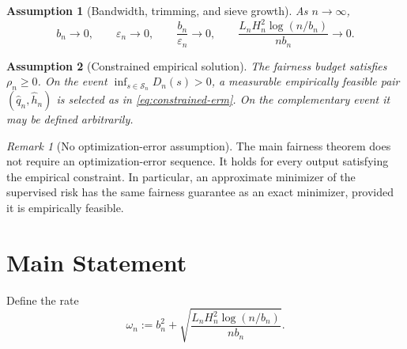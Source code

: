 \documentclass[11pt]{article}
\newtheorem{assumption}{Assumption}[section]
\theoremstyle{remark}
\newtheorem{remark}{Remark}[section]
\newcommand{\cS}{\mathcal{S}}
\newcommand{\wh}{\widehat}
\newcommand{\eps}{\varepsilon}
\begin{document}
\begin{assumption}[Bandwidth, trimming, and sieve growth]
\label{ass:rate}
As $n\to\infty$,
\begin{equation}
  b_n\to0,
  \qquad
  \eps_n\to0,
  \qquad
  \frac{b_n}{\eps_n}\to0,
  \qquad
  \frac{L_nH_n^2\log(n/b_n)}{nb_n}\to0.
  \label{eq:rate-condition}
\end{equation}
\end{assumption}

\begin{assumption}[Constrained empirical solution]
\label{ass:solution}
The fairness budget satisfies $\rho_n\ge0$.  On the event
$\inf_{s\in\cS_n}D_n(s)>0$, a measurable empirically feasible pair
$(\wh q_n,\wh h_n)$ is selected as in \eqref{eq:constrained-erm}.  On the
complementary event it may be defined arbitrarily.
\end{assumption}

\begin{remark}[No optimization-error assumption]
The main fairness theorem does not require an optimization-error sequence.  It
holds for every output satisfying the empirical constraint.  In particular, an
approximate minimizer of the supervised risk has the same fairness guarantee as
an exact minimizer, provided it is empirically feasible.
\end{remark}

\section{Main Statement}

Define the rate
\begin{equation}
  \omega_n
  :=
  b_n^2
  +
  \sqrt{
    \frac{L_nH_n^2\log(n/b_n)}{nb_n}
  }.
  \label{eq:omega-rate}
\end{equation}
\end{document}
